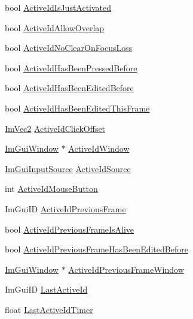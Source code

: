 \begin{DoxyCompactItemize}
\item 
bool \hyperlink{structImGuiContext_aa539096bf2b0ab28e0dbf73d595c64d8}{Active\+Id\+Is\+Just\+Activated}
\item 
bool \hyperlink{structImGuiContext_ab3234556023eabcfed157b79ba4c5869}{Active\+Id\+Allow\+Overlap}
\item 
bool \hyperlink{structImGuiContext_aea817da782a375aa3911f35521a9090a}{Active\+Id\+No\+Clear\+On\+Focus\+Loss}
\item 
bool \hyperlink{structImGuiContext_aa2767e20ba942d8e962d02c9cb533a3f}{Active\+Id\+Has\+Been\+Pressed\+Before}
\item 
bool \hyperlink{structImGuiContext_acf057448394a0ecf0ac84e2ea166cfe5}{Active\+Id\+Has\+Been\+Edited\+Before}
\item 
bool \hyperlink{structImGuiContext_ae7b64858c8ca5a15d62173401ca07c50}{Active\+Id\+Has\+Been\+Edited\+This\+Frame}
\item 
\hyperlink{structImVec2}{Im\+Vec2} \hyperlink{structImGuiContext_a28afb4e9b4ac155825f4b4c94cdc516c}{Active\+Id\+Click\+Offset}
\item 
\hyperlink{structImGuiWindow}{Im\+Gui\+Window} $\ast$ \hyperlink{structImGuiContext_a95a35b5d82d3fdea28b71580dc6a9618}{Active\+Id\+Window}
\item 
\hyperlink{imgui__internal_8h_a8ee603a145a3a4f4ab5c93c8c8333b78}{Im\+Gui\+Input\+Source} \hyperlink{structImGuiContext_a315c9fa88996fa84c260c93322941bf1}{Active\+Id\+Source}
\item 
int \hyperlink{structImGuiContext_a106b9339c22785c0f707edd87b46566e}{Active\+Id\+Mouse\+Button}
\item 
Im\+Gui\+ID \hyperlink{structImGuiContext_af58aa479f6c97819694f1709b62c70d8}{Active\+Id\+Previous\+Frame}
\item 
bool \hyperlink{structImGuiContext_aaaf25ebc4878ed8b203106accfc6b896}{Active\+Id\+Previous\+Frame\+Is\+Alive}
\item 
bool \hyperlink{structImGuiContext_a47f47219d46552ceb11dc1eea8415cbb}{Active\+Id\+Previous\+Frame\+Has\+Been\+Edited\+Before}
\item 
\hyperlink{structImGuiWindow}{Im\+Gui\+Window} $\ast$ \hyperlink{structImGuiContext_ac164cf439dcb5d37f0e572f5e27eea25}{Active\+Id\+Previous\+Frame\+Window}
\item 
Im\+Gui\+ID \hyperlink{structImGuiContext_a8609dbb667eced2b9f1eb1f0c0aff838}{Last\+Active\+Id}
\item 
float \hyperlink{structImGuiContext_a7296c8f2a4794c561cfb4ad0af563928}{Last\+Active\+Id\+Timer}

\end{DoxyCompactItemize}
